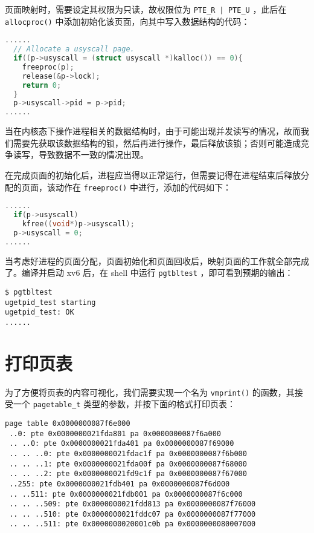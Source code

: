 页面映射时，需要设定其权限为只读，故权限位为 \lstinline{PTE_R | PTE_U} ，此后在 \lstinline{allocproc()} 中添加初始化该页面，向其中写入数据结构的代码：
\begin{lstlisting}[language=C]
......
  // Allocate a usyscall page.
  if((p->usyscall = (struct usyscall *)kalloc()) == 0){
    freeproc(p);
    release(&p->lock);
    return 0;
  }
  p->usyscall->pid = p->pid;
......
\end{lstlisting}
\begin{theorem}[注意加锁] 
    当在内核态下操作进程相关的数据结构时，由于可能出现并发读写的情况，故而我们需要先获取该数据结构的锁，然后再进行操作，最后释放该锁；否则可能造成竞争读写，导致数据不一致的情况出现。
\end{theorem}

在完成页面的初始化后，进程应当得以正常运行，但需要记得在进程结束后释放分配的页面，该动作在 \lstinline{freeproc()} 中进行，添加的代码如下：
\begin{lstlisting}[language=C]
......
  if(p->usyscall)
    kfree((void*)p->usyscall);
  p->usyscall = 0;
......
\end{lstlisting}

当考虑好进程的页面分配，页面初始化和页面回收后，映射页面的工作就全部完成了。编译并启动 xv6 后，在 shell 中运行 \lstinline{pgtbltest} ，即可看到预期的输出：
\begin{lstlisting}
$ pgtbltest
ugetpid_test starting
ugetpid_test: OK
......
\end{lstlisting}

\section{打印页表}

为了方便将页表的内容可视化，我们需要实现一个名为 \lstinline{vmprint()} 的函数，其接受一个 \lstinline{pagetable_t} 类型的参数，并按下面的格式打印页表：
\begin{lstlisting}
page table 0x0000000087f6e000
 ..0: pte 0x0000000021fda801 pa 0x0000000087f6a000
 .. ..0: pte 0x0000000021fda401 pa 0x0000000087f69000
 .. .. ..0: pte 0x0000000021fdac1f pa 0x0000000087f6b000
 .. .. ..1: pte 0x0000000021fda00f pa 0x0000000087f68000
 .. .. ..2: pte 0x0000000021fd9c1f pa 0x0000000087f67000
 ..255: pte 0x0000000021fdb401 pa 0x0000000087f6d000
 .. ..511: pte 0x0000000021fdb001 pa 0x0000000087f6c000
 .. .. ..509: pte 0x0000000021fdd813 pa 0x0000000087f76000
 .. .. ..510: pte 0x0000000021fddc07 pa 0x0000000087f77000
 .. .. ..511: pte 0x0000000020001c0b pa 0x0000000080007000
\end{lstlisting}

